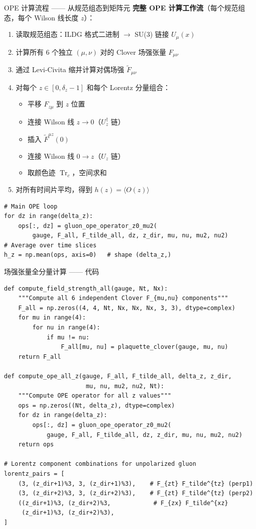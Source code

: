 \documentclass[10pt,aspectratio=169]{beamer}
\newcommand{\trc}{\operatorname{Tr}_c}
\begin{document}
\begin{frame}[fragile]{OPE 计算流程 —— 从规范组态到矩阵元}
\small
\textbf{完整 OPE 计算工作流}（每个规范组态，每个 Wilson 线长度 $z$）：
\begin{enumerate}
  \item[1.] 读取规范组态：ILDG 格式二进制 $\to$ SU(3) 链接 $U_\mu(x)$
  \item[2.] 计算所有 6 个独立 $(μ,ν)$ 对的 Clover 场强张量 $F_{μν}$
  \item[3.] 通过 Levi-Civita 缩并计算对偶场强 $\tilde{F}_{μν}$
  \item[4.] 对每个 $z \in [0, \delta_z-1]$ 和每个 Lorentz 分量组合：
    \begin{itemize}
      \item 平移 $F_{z\mu}$ 到 $z$ 位置
      \item 连接 Wilson 线 $z \to 0$（$U_z^\dagger$ 链）
      \item 插入 $\tilde{F}^{\mu z}(0)$
      \item 连接 Wilson 线 $0 \to z$（$U_z$ 链）
      \item 取颜色迹 $\trc$，空间求和
    \end{itemize}
  \item[5.] 对所有时间片平均，得到 $h(z) = \langle O(z) \rangle$
\end{enumerate}

\begin{lstlisting}
# Main OPE loop
for dz in range(delta_z):
    ops[:, dz] = gluon_ope_operator_z0_mu2(
        gauge, F_all, F_tilde_all, dz, z_dir, mu, nu, mu2, nu2)
# Average over time slices
h_z = np.mean(ops, axis=0)   # shape (delta_z,)
\end{lstlisting}
\end{frame}

\begin{frame}[fragile]{场强张量全分量计算 —— 代码}
\begin{lstlisting}
def compute_field_strength_all(gauge, Nt, Nx):
    """Compute all 6 independent Clover F_{mu,nu} components"""
    F_all = np.zeros((4, 4, Nt, Nx, Nx, Nx, 3, 3), dtype=complex)
    for mu in range(4):
        for nu in range(4):
            if mu != nu:
                F_all[mu, nu] = plaquette_clover(gauge, mu, nu)
    return F_all

def compute_ope_all_z(gauge, F_all, F_tilde_all, delta_z, z_dir,
                       mu, nu, mu2, nu2, Nt):
    """Compute OPE operator for all z values"""
    ops = np.zeros((Nt, delta_z), dtype=complex)
    for dz in range(delta_z):
        ops[:, dz] = gluon_ope_operator_z0_mu2(
            gauge, F_all, F_tilde_all, dz, z_dir, mu, nu, mu2, nu2)
    return ops

# Lorentz component combinations for unpolarized gluon
lorentz_pairs = [
    (3, (z_dir+1)%3, 3, (z_dir+1)%3),    # F_{zt} F_tilde^{tz} (perp1)
    (3, (z_dir+2)%3, 3, (z_dir+2)%3),    # F_{zt} F_tilde^{tz} (perp2)
    ((z_dir+1)%3, (z_dir+2)%3,            # F_{zx} F_tilde^{xz}
     (z_dir+1)%3, (z_dir+2)%3),
]
\end{lstlisting}
\end{frame}
\end{document}
